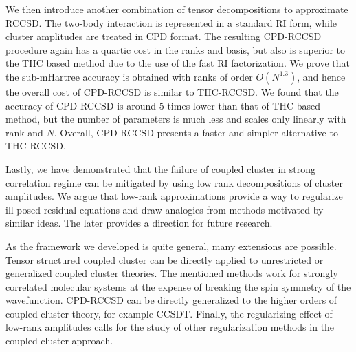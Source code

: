We then introduce another combination of tensor decompositions to approximate 
RCCSD. The two-body interaction is represented in a standard RI form, 
while cluster amplitudes are treated in CPD format. The resulting CPD-RCCSD 
procedure again has a quartic cost in the ranks and basis, but also is superior 
to the THC based method due to the use of the fast RI factorization. We prove 
that the sub-mHartree accuracy is obtained with ranks of order $O(N^{1.3})$, 
and hence the overall cost of CPD-RCCSD is similar to THC-RCCSD. We found that 
the accuracy of CPD-RCCSD is around $5$ times lower than that of THC-based 
method, but the number of parameters is much less and scales only linearly 
with rank and $N$. Overall, CPD-RCCSD presents a faster and simpler alternative 
to THC-RCCSD. 

Lastly, we have demonstrated that the failure of coupled cluster in strong 
correlation regime can be mitigated by using low rank decompositions of 
cluster amplitudes. We argue that low-rank approximations provide a way to 
regularize ill-posed residual equations and draw analogies from methods 
motivated by similar ideas. The later provides a direction for future 
research.

As the framework we developed is quite general, many extensions are possible. 
Tensor structured coupled cluster can be directly applied to unrestricted or 
generalized coupled cluster theories. The mentioned methods work for strongly 
correlated molecular systems at the expense of breaking the spin symmetry of 
the wavefunction. CPD-RCCSD can be directly generalized to the higher orders of 
coupled cluster theory, for example CCSDT. Finally, the regularizing effect of 
low-rank amplitudes calls for the study of other regularization methods in the 
coupled cluster approach.